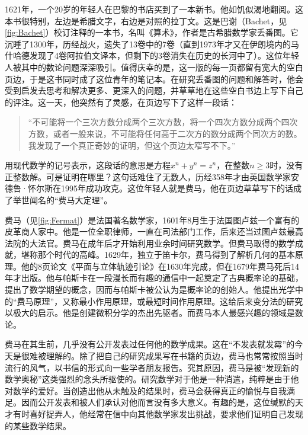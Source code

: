 \documentclass[b5paper]{ctexart}
\begin{document}
\begin{mdframed}

1621年，一个20岁的年轻人在巴黎的书店买到了一本新书。他如饥似渴地翻阅。这本书很特别，左边是希腊文字，右边是对照的拉丁文。这是巴谢（Bachet，见\cref{fig:Bachet}）校订注释的一本书，名叫《算术》，作者是古希腊数学家丢番图。它沉睡了1300年，历经战火，遗失了13卷中的7卷（直到1973年才又在伊朗境内的马什哈德发现了4卷阿拉伯文译本，但剩下的3卷消失在历史的长河中了）。这位年轻人被其中的数论问题深深吸引。值得庆幸的是，这一版的每一页都留有宽大的空白页边，于是这书同时成了这位青年的笔记本。在研究丢番图的问题和解答时，他会受到启发去思考和解决更多、更深入的问题，并草草地在这些空白书边上写下自己的评注。这一天，他突然有了灵感，在页边写下了这样一段话：

\begin{quotation} 
“不可能将一个三次方数分成两个三次方数，将一个四次方数分成两个四次方数，或者一般来说，不可能将任何高于二次方的数分成两个同次方的数。我发现了一个真正奇妙的证明，但这个页边太窄写不下。”
\end{quotation}

用现代数学的记号表示，这段话的意思是方程$x^n + y^n = z^n$，在整数$n \geq 3$时，没有正整数解。可是证明在哪里？这句话难住了无数人，历经358年才由英国数学家安德鲁·怀尔斯在1995年成功攻克。这位年轻人就是费马，他在页边草草写下的话成了举世闻名的“费马大定理”。

费马（见\cref{fig:Fermat}）是法国著名数学家，1601年8月生于法国图卢兹一个富有的皮革商人家中。他是一位全职律师，一直在司法部门工作，后来还当过图卢兹最高法院的大法官。费马在成年后才开始利用业余时间研究数学。但费马取得的数学成就，堪称那个时代的高峰。1629年，独立于笛卡尔，费马得到了解析几何的基本原理。他的8页论文《平面与立体轨迹引论》在1630年完成，但在1679年费马死后14年才出版。他与帕斯卡在一段漫长而有趣的通信中一起奠定了古典概率论的基础，提出了数学期望的概念，因而与帕斯卡被公认为是概率论的创始人。他提出光学中的“费马原理”，又称最小作用原理，或最短时间作用原理。这给后来变分法的研究以极大的启示。他是创建微积分学的杰出先驱者。而费马本人最感兴趣的领域是数论。

费马在其生前，几乎没有公开发表过任何他的数学成果。这在“不发表就发霉”的今天是很难被理解的。除了把自己的研究成果写在书籍的页边，费马也常常按照当时流行的风气，以书信的形式向一些学者朋友报告。究其原因，费马是被“发现新的数学奥秘”这类强烈的念头所驱使的。研究数学对于他是一种消遣，纯粹是由于他对数学的爱好。当创造出他从未触及的结果时，费马会获得真正的愉悦与自我满足。因而公开发表和被人们承认对他而言没有多大意义\cite{HanXueTao2009}。有趣的是，这位缄默的天才有时喜好捉弄人，他经常在信中向其他数学家发出挑战，要求他们证明自己发现的某些数学结果。


\end{mdframed}
\end{document}
